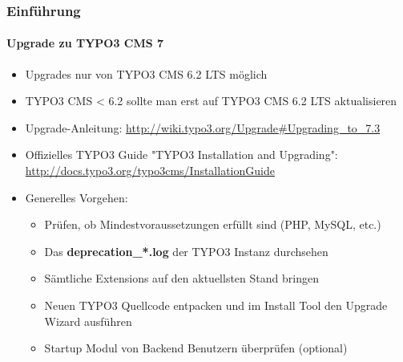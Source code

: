 \begin{frame}[fragile]
	\frametitle{Einführung}
	\framesubtitle{Upgrade zu TYPO3 CMS 7}

	\begin{itemize}
		\item Upgrades nur von TYPO3 CMS 6.2 LTS möglich
		\item TYPO3 CMS < 6.2 sollte man erst auf TYPO3 CMS 6.2 LTS aktualisieren
	\end{itemize}

	\begin{itemize}

		\item Upgrade-Anleitung:\newline
			\smaller\url{http://wiki.typo3.org/Upgrade#Upgrading_to_7.3}\normalsize
		\item Offizielles TYPO3 Guide "TYPO3 Installation and Upgrading":
			\smaller\url{http://docs.typo3.org/typo3cms/InstallationGuide}\normalsize
		\item Generelles Vorgehen:
			\begin{itemize}
				\item Prüfen, ob Mindestvoraussetzungen erfüllt sind \small(PHP, MySQL, etc.)
				\item Das \textbf{deprecation\_*.log} der TYPO3 Instanz durchsehen
				\item Sämtliche Extensions auf den aktuellsten Stand bringen
				\item Neuen TYPO3 Quellcode entpacken und im Install Tool den Upgrade Wizard ausführen
				\item Startup Modul von Backend Benutzern überprüfen (optional)
			\end{itemize}
	\end{itemize}

\end{frame}

